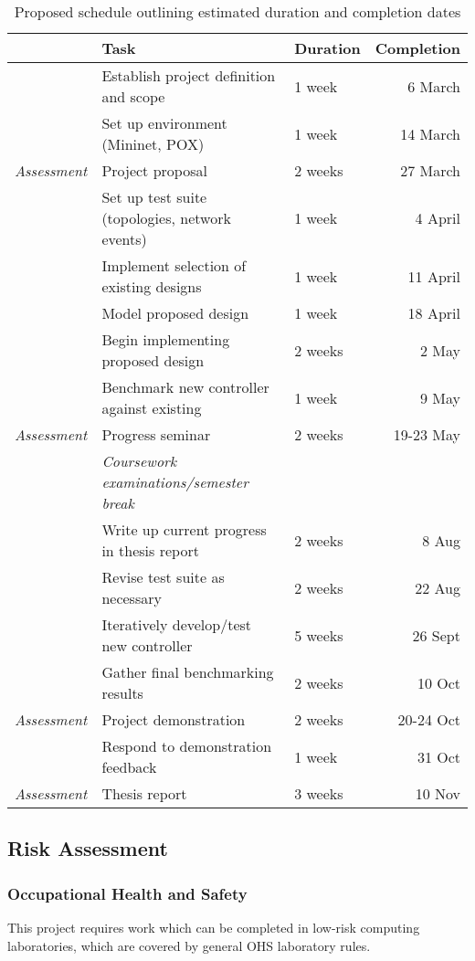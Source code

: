 \documentclass[pdftex,12pt,a4paper]{article}
\begin{document}
\begin{table}[H]
	\begin{center}
		\begin{tabular}{@{}rllr@{}}
			\toprule
			& Task & Duration & Completion\\
			\midrule
			& Establish project definition and scope & 1 week & 6 March \\
			& Set up environment (Mininet,  POX) & 1 week & 14 March \\
			\emph{Assessment} & Project proposal & 2 weeks & 27 March \\
			& Set up test suite (topologies, network events) & 1 week & 4 April \\
			& Implement selection of existing designs & 1 week & 11 April \\
			& Model proposed design & 1 week & 18 April \\
			& Begin implementing proposed design & 2 weeks & 2 May \\
			& Benchmark new controller against existing & 1 week & 9 May \\
			\emph{Assessment} & Progress seminar & 2 weeks & 19-23 May \\
			\addlinespace
			& \emph{Coursework examinations/semester break} \\
			\addlinespace
			& Write up current progress in thesis report & 2 weeks & 8 Aug\\
			& Revise test suite as necessary & 2 weeks & 22 Aug\\
			& Iteratively develop/test new controller & 5 weeks & 26 Sept\\
			& Gather final benchmarking results & 2 weeks & 10 Oct \\
			\emph{Assessment} & Project demonstration & 2 weeks & 20-24 Oct \\
			& Respond to demonstration feedback & 1 week & 31 Oct \\
			\emph{Assessment} & Thesis report & 3 weeks & 10 Nov \\
			\bottomrule
		\end{tabular}
		\caption{Proposed schedule outlining estimated duration and completion dates}
		\label{table:schedule}
	\end{center}
\end{table}

\subsection{Risk Assessment}
\subsubsection{Occupational Health and Safety}
This project requires work which can be completed in low-risk computing laboratories, which are covered by general OHS laboratory rules.
\end{document}
